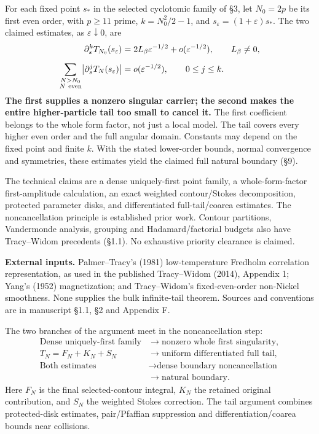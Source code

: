 \documentclass[11pt,a4paper]{article}
\newcommand{\heading}[1]{\par\vspace{5pt}{\large\bfseries #1}\par\vspace{1pt}}
\begin{document}
\heading{Two estimates that carry the conclusion}
For each fixed point \(s_*\) in the selected cyclotomic family of
\S3, let \(N_0=2p\) be its first even order, with \(p\ge11\) prime,
\(k=N_0^2/2-1\), and \(s_\varepsilon=(1+\varepsilon)s_*\).
The two claimed estimates, as \(\varepsilon\downarrow0\), are
\begin{align*}
\partial_s^kT_{N_0}(s_\varepsilon)
 &=2L_\beta\varepsilon^{-1/2}+o(\varepsilon^{-1/2}),
 \qquad L_\beta\ne0,\\[5pt]
\sum_{\substack{N>N_0\\N\ {\rm even}}}
 \bigl|\partial_s^jT_N(s_\varepsilon)\bigr|
 &=o(\varepsilon^{-1/2}),\qquad 0\le j\le k.
\end{align*}
\textbf{The first supplies a nonzero singular carrier; the second makes
the entire higher-particle tail too small to cancel it.}
The first coefficient belongs to the whole form factor, not just a local
model. The tail covers every higher even order and the full angular domain.
Constants may depend on the fixed point and finite \(k\). With the stated
lower-order bounds, normal convergence and symmetries, these estimates
yield the claimed full natural boundary (\S9).

\heading{The proposed bulk implementation}
The technical claims are a dense uniquely-first point family, a
whole-form-factor first-amplitude calculation, an exact weighted
contour/Stokes decomposition, protected parameter disks, and differentiated
full-tail/coarea estimates. The noncancellation principle is established
prior work. Contour partitions, Vandermonde analysis, grouping and
Hadamard/factorial budgets also have Tracy--Widom precedents (\S1.1).
No exhaustive priority clearance is claimed.

\textbf{External inputs.} Palmer--Tracy's (1981) low-temperature Fredholm
correlation representation, as used in the published Tracy--Widom (2014), Appendix 1;
Yang's (1952) magnetization; and Tracy--Widom's fixed-even-order non-Nickel smoothness.
None supplies the bulk infinite-tail theorem. Sources and conventions
are in manuscript \S1.1, \S2 and Appendix F.

\newpage
\heading{Proof architecture}
The two branches of the argument meet in the noncancellation step:
\[
\begin{aligned}
\text{Dense uniquely-first family}
 &\longrightarrow \text{nonzero whole first singularity},\\[3pt]
T_N=F_N+K_N+S_N
 &\longrightarrow \text{uniform differentiated full tail},\\[3pt]
\text{Both estimates}
 &\longrightarrow \text{dense boundary noncancellation}\\[-1pt]
 &\longrightarrow \text{natural boundary}.
\end{aligned}
\]
Here \(F_N\) is the final selected-contour integral, \(K_N\) the retained
original contribution, and \(S_N\) the weighted Stokes correction.
The tail argument combines protected-disk estimates, pair/Pfaffian
suppression and differentiation/coarea bounds near collisions.
\end{document}
